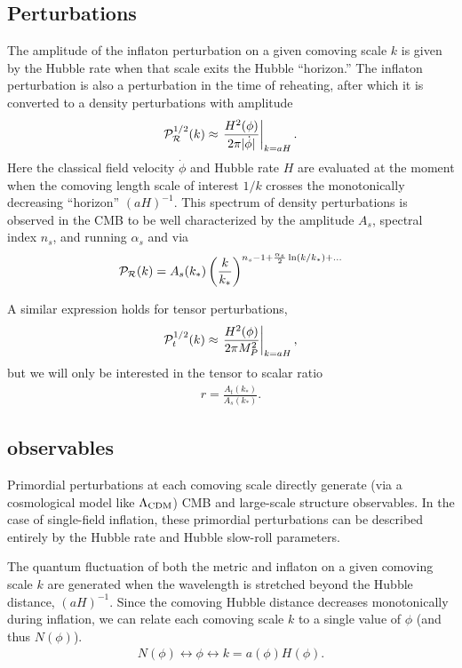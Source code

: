 \documentclass[aps,amsfonts,amsmath,prd,preprint,nofootinbib,superscriptaddress]{revtex4}
\newcommand{\MMp}{{M_P^2}}
\begin{document}
\subsection{Perturbations}
The amplitude of the inflaton perturbation on a given comoving scale $k$ is given by the Hubble rate when that
scale exits the Hubble ``horizon.''   The inflaton perturbation is also a perturbation in the time of reheating, after which it is converted to a density perturbations with
amplitude
\begin{align}
{\cal P}_{\cal R}^{1/2}(k) \approx \left.\frac{H^2(\phi)}{2\pi|\dot\phi|}\right|_{k = a H}.
\end{align}
Here the classical field velocity $\dot\phi$ and Hubble rate $H$ are evaluated at the moment when the comoving length scale of interest $1/k$ crosses the monotonically decreasing ``horizon'' $(aH)^{-1}$.
This spectrum of density perturbations is observed in the CMB to be well characterized by the amplitude $A_s$, spectral index $n_s$, and running $\alpha_s$ and via
\begin{align}
 {\cal P}_{\cal R}(k) = A_s(k_\ast)\left(\frac{k}{k_\ast}\right)^{n_s - 1 + \frac{\alpha_s}{2}\ln(k/k_\ast) + ...}
\end{align}

A similar expression holds for tensor perturbations, 
\begin{align}
{\cal P}_{t}^{1/2}(k) \approx \left.\frac{H^2(\phi)}{2\pi\MMp}\right|_{k = a H},
\end{align}
but we will only be interested in the tensor to scalar ratio
\begin{align}
r = \frac{A_t(k_\ast)}{A_s(k_\ast)}.
\end{align}


\subsection{observables}
Primordial perturbations at each comoving scale directly 
generate (via a cosmological model like $\Lambda_{\rm CDM}$) CMB and large-scale structure observables.   In the case of single-field inflation, these primordial perturbations can 
be described entirely by the Hubble rate and Hubble slow-roll parameters.

The quantum fluctuation of both the metric and inflaton on a given comoving scale $k$ are generated when the wavelength is stretched beyond the Hubble distance, $(a H)^{-1}$.
Since the comoving Hubble distance decreases monotonically during inflation, we can relate each comoving scale $k$ to a single value of $\phi$ (and thus $N(\phi)$). 
\begin{align}
N(\phi) \longleftrightarrow \phi \longleftrightarrow k = a(\phi) H(\phi).
\end{align}  
\end{document}
